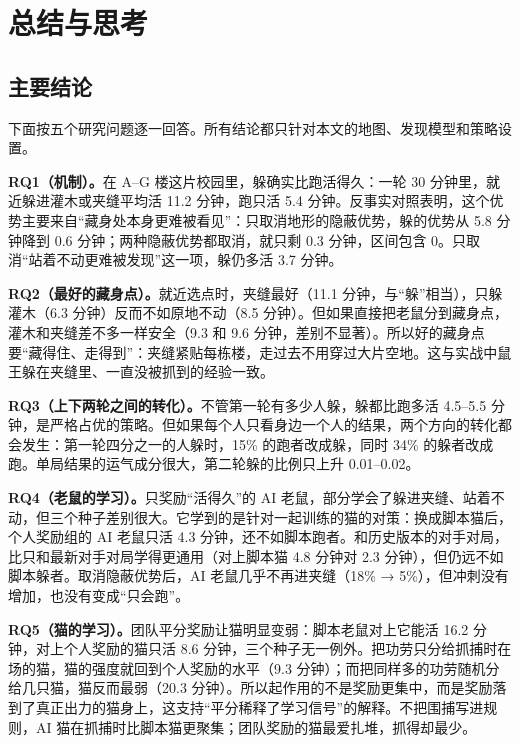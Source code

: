 \section{总结与思考}
\subsection{主要结论}
下面按五个研究问题逐一回答。所有结论都只针对本文的地图、发现模型和策略设置。

\textbf{RQ1（机制）。}在 A–G 楼这片校园里，躲确实比跑活得久：一轮 30 分钟里，就近躲进灌木或夹缝平均活 11.2 分钟，跑只活 5.4 分钟。反事实对照表明，这个优势主要来自“藏身处本身更难被看见”：只取消地形的隐蔽优势，躲的优势从 5.8 分钟降到 0.6 分钟；两种隐蔽优势都取消，就只剩 0.3 分钟，区间包含 0。只取消“站着不动更难被发现”这一项，躲仍多活 3.7 分钟。

\textbf{RQ2（最好的藏身点）。}就近选点时，夹缝最好（11.1 分钟，与“躲”相当），只躲灌木（6.3 分钟）反而不如原地不动（8.5 分钟）。但如果直接把老鼠分到藏身点，灌木和夹缝差不多一样安全（9.3 和 9.6 分钟，差别不显著）。所以好的藏身点要“藏得住、走得到”：夹缝紧贴每栋楼，走过去不用穿过大片空地。这与实战中鼠王躲在夹缝里、一直没被抓到的经验一致。

\textbf{RQ3（上下两轮之间的转化）。}不管第一轮有多少人躲，躲都比跑多活 4.5–5.5 分钟，是严格占优的策略。但如果每个人只看身边一个人的结果，两个方向的转化都会发生：第一轮四分之一的人躲时，15\% 的跑者改成躲，同时 34\% 的躲者改成跑。单局结果的运气成分很大，第二轮躲的比例只上升 0.01–0.02。

\textbf{RQ4（老鼠的学习）。}只奖励“活得久”的 AI 老鼠，部分学会了躲进夹缝、站着不动，但三个种子差别很大。它学到的是针对一起训练的猫的对策：换成脚本猫后，个人奖励组的 AI 老鼠只活 4.3 分钟，还不如脚本跑者。和历史版本的对手对局，比只和最新对手对局学得更通用（对上脚本猫 4.8 分钟对 2.3 分钟），但仍远不如脚本躲者。取消隐蔽优势后，AI 老鼠几乎不再进夹缝（18\% → 5\%），但冲刺没有增加，也没有变成“只会跑”。

\textbf{RQ5（猫的学习）。}团队平分奖励让猫明显变弱：脚本老鼠对上它能活 16.2 分钟，对上个人奖励的猫只活 8.6 分钟，三个种子无一例外。把功劳只分给抓捕时在场的猫，猫的强度就回到个人奖励的水平（9.3 分钟）；而把同样多的功劳随机分给几只猫，猫反而最弱（20.3 分钟）。所以起作用的不是奖励更集中，而是奖励落到了真正出力的猫身上，这支持“平分稀释了学习信号”的解释。不把围捕写进规则，AI 猫在抓捕时比脚本猫更聚集；团队奖励的猫最爱扎堆，抓得却最少。

